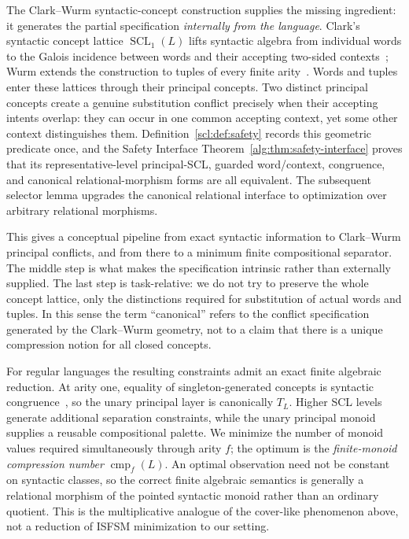 \documentclass[10pt,a4paper]{article}
\theoremstyle{definition}
\theoremstyle{remark}
\newcommand{\cmp}{\operatorname{cmp}}
\newcommand{\SCL}{\operatorname{SCL}}
\begin{document}
The Clark--Wurm syntactic-concept construction supplies the missing ingredient:
it generates the partial specification \emph{internally from the language}.
Clark's syntactic concept lattice $\SCL_1(L)$ lifts syntactic algebra from
individual words to the Galois incidence between words and their accepting
two-sided contexts~\cite{ClarkSCL}; Wurm extends the construction to tuples of
every finite arity~\cite{WurmSCLTuples}.  Words and tuples enter these lattices
through their principal concepts.  Two distinct principal concepts create a
genuine substitution conflict precisely when their accepting intents overlap:
they can occur in one common accepting context, yet some other context
distinguishes them.  Definition~\ref{scl:def:safety} records this geometric predicate once, and the
Safety Interface Theorem~\ref{alg:thm:safety-interface} proves that its
representative-level principal-SCL, guarded word/context, congruence, and
canonical relational-morphism forms are all equivalent.  The subsequent
selector lemma upgrades the canonical relational interface to optimization over
arbitrary relational morphisms.

This gives a conceptual pipeline from exact syntactic information to
Clark--Wurm principal conflicts, and from there to a minimum finite
compositional separator.
The middle step is what makes the specification intrinsic rather than
externally supplied.  The last step is task-relative: we do not try to preserve
the whole concept lattice, only the distinctions required for substitution of
actual words and tuples.  In this sense the term ``canonical'' refers to the
conflict specification generated by the Clark--Wurm geometry, not to a claim
that there is a unique compression notion for all closed concepts.

For regular languages the resulting constraints admit an exact finite
algebraic reduction.  At arity one, equality of singleton-generated concepts
is syntactic congruence~\cite[Proposition~3.19]{ClarkSCL}, so the unary
principal layer is canonically $T_L$.  Higher SCL levels generate additional
separation constraints, while the unary principal monoid supplies a reusable
compositional palette.  We minimize the number of monoid values required
simultaneously through arity $f$; the optimum is the \emph{finite-monoid
compression number} $\cmp_f(L)$.  An optimal observation need not be constant
on syntactic classes, so the correct finite algebraic semantics is generally a
relational morphism of the pointed syntactic monoid rather than an ordinary
quotient.  This is the multiplicative analogue of the cover-like phenomenon
above, not a reduction of ISFSM minimization to our setting.
\end{document}
